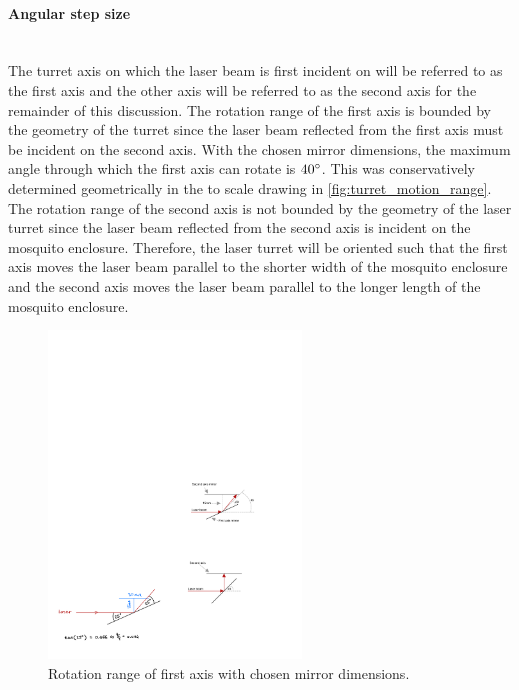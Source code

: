 \label{par:angular_step_size}
\paragraph{Angular step size}\mbox{}\\
The turret axis on which the laser beam is first incident on will be referred to as the first axis and the other axis will be referred to as the second axis for the remainder of this discussion. The rotation range of the first axis is bounded by the geometry of the turret since the laser beam reflected from the first axis must be incident on the second axis. With the chosen mirror dimensions, the maximum angle through which the first axis can rotate is $40^{\circ}$. This was conservatively determined geometrically in the to scale drawing in \autoref{fig:turret_motion_range}. The rotation range of the second axis is not bounded by the geometry of the laser turret since the laser beam reflected from the second axis is incident on the mosquito enclosure. Therefore, the laser turret will be oriented such that the first axis moves the laser beam parallel to the shorter width of the mosquito enclosure and the second axis moves the laser beam parallel to the longer length of the mosquito enclosure.
\begin{figure}[h]
    \centering
    \includegraphics[width=0.6\textwidth]{figures/hardware_design/rotation_range_of_first_axis.pdf}
    \caption{Rotation range of first axis with chosen mirror dimensions.}
    \label{fig:turret_motion_range}
\end{figure}


